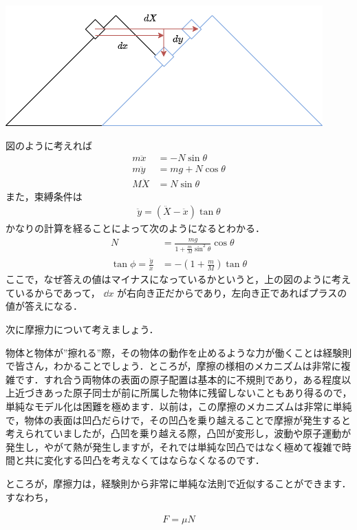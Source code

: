 \documentclass[
  b4paperpaper,
  xelatex,ja=standard]{bxjsbook}
\begin{document}

\includegraphics{source/images/newton/newton15.png}

図のように考えれば \begin{align*}
m\ddot{x}&=-N\sin\theta\\
m\ddot{y}&=mg+N\cos\theta\\
M\ddot{X}&=N\sin\theta
\end{align*} また，束縛条件は \begin{align*}
\ddot{y}=(\ddot{X}-\ddot{x})\tan\theta
\end{align*} かなりの計算を経ることによって次のようになるとわかる．
\begin{align*}
N&=\frac{mg}{1+\frac{m}{M}\sin ^2 \theta}\cos \theta\\
\tan \phi = \frac{\ddot{y}}{\ddot{x}}&=-\left(1+\frac{m}{M}\right)\tan \theta
\end{align*}
ここで，なぜ答えの値はマイナスになっているかというと，上の図のように考えているからであって，
\(\dd x\)
が右向き正だからであり，左向き正であればプラスの値が答えになる．

次に摩擦力について考えましょう．

物体と物体が''擦れる''際，その物体の動作を止めるような力が働くことは経験則で皆さん，わかることでしょう．ところが，摩擦の様相のメカニズムは非常に複雑です．すれ合う両物体の表面の原子配置は基本的に不規則であり，ある程度以上近づきあった原子同士が前に所属した物体に残留しないこともあり得るので，単純なモデル化は困難を極めます．以前は，この摩擦のメカニズムは非常に単純で，物体の表面は凹凸だらけで，その凹凸を乗り越えることで摩擦が発生すると考えられていましたが，凸凹を乗り越える際，凸凹が変形し，波動や原子運動が発生し，やがて熱が発生しますが，それでは単純な凹凸ではなく極めて複雑で時間と共に変化する凹凸を考えなくてはならなくなるのです．

ところが，摩擦力は，経験則から非常に単純な法則で近似することができます．すなわち，

\begin{align*}
F=\mu N
\end{align*}
\end{document}
